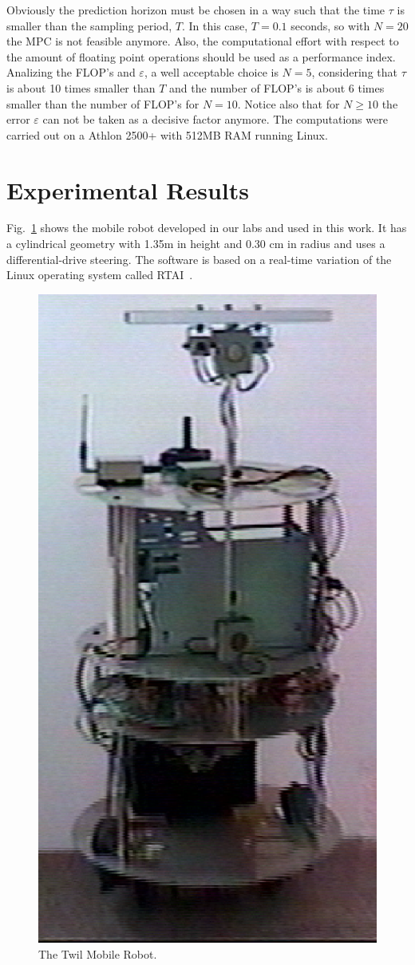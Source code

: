 \documentclass[conference]{IEEEtran} %
\begin{document}
Obviously the prediction horizon must be chosen in a way such that the time $\tau$ is smaller than the sampling period, $T$. In this case, $T=0.1$ seconds, so with $N=20$ the MPC is not feasible anymore. Also, the computational effort with respect to the amount of floating point operations should be used as a performance index. Analizing the FLOP's and $\varepsilon$, a well acceptable choice is $N=5$, considering that $\tau$ is about 10 times smaller than $T$ and the number of FLOP's is about 6 times smaller than the number of FLOP's for $N=10$. Notice also that for $N\geq10$ the error $\varepsilon$ can not be taken as a decisive factor anymore. The computations were carried out on a Athlon 2500+ with 512MB RAM running Linux.


\section{Experimental Results}
\label{sec:exp}

Fig.~\ref{fig:twil} shows the mobile robot developed in our labs and used in this work. It has a cylindrical geometry with 1.35m in height and 0.30 cm in radius and uses a differential-drive steering. The software is based on a real-time variation of the Linux operating system called RTAI~\cite{Dozio:2003}.

\begin{figure}[htbp]
	\centering
	\includegraphics[width=0.65\linewidth]{Figures/twil6.ps}
	\caption{The Twil Mobile Robot.}
	\label{fig:twil}
\end{figure}
\end{document}
